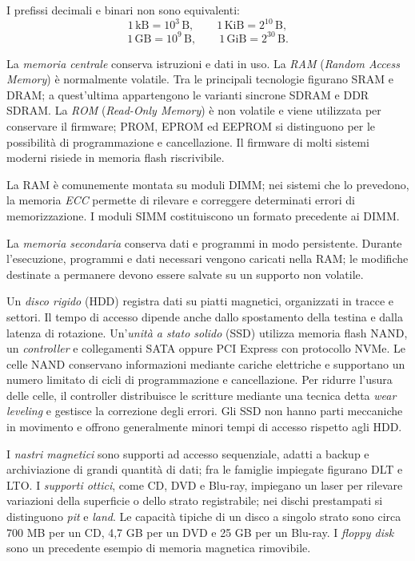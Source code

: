 I prefissi decimali e binari non sono equivalenti:
\[
  1\,\mathrm{kB}=10^3\,\mathrm{B},
  \qquad
  1\,\mathrm{KiB}=2^{10}\,\mathrm{B},
\]
\[
  1\,\mathrm{GB}=10^9\,\mathrm{B},
  \qquad
  1\,\mathrm{GiB}=2^{30}\,\mathrm{B}.
\]

La \emph{memoria centrale} conserva istruzioni e dati in uso.
La \emph{RAM} (\emph{Random Access Memory}) è normalmente volatile.
Tra le principali tecnologie figurano SRAM e DRAM; a quest'ultima
appartengono le varianti sincrone SDRAM e DDR SDRAM.
La \emph{ROM} (\emph{Read-Only Memory}) è non volatile e viene
utilizzata per conservare il firmware; PROM, EPROM ed EEPROM si
distinguono per le possibilità di programmazione e cancellazione. Il
firmware di molti sistemi moderni risiede in memoria flash riscrivibile.

La RAM è comunemente montata su moduli DIMM; nei sistemi che lo
prevedono, la memoria \emph{ECC} permette di rilevare e correggere
determinati errori di memorizzazione. I moduli SIMM costituiscono
un formato precedente ai DIMM.

La \emph{memoria secondaria} conserva dati e programmi in modo
persistente. Durante l'esecuzione, programmi e dati necessari vengono
caricati nella RAM; le modifiche destinate a permanere devono essere
salvate su un supporto non volatile.

Un \emph{disco rigido} (HDD) registra dati su piatti magnetici,
organizzati in tracce e settori. Il tempo di accesso dipende anche
dallo spostamento della testina e dalla latenza di rotazione.
Un'\emph{unità a stato solido} (SSD) utilizza memoria flash NAND,
un \emph{controller} e collegamenti SATA oppure PCI Express con
protocollo NVMe. Le celle NAND conservano informazioni mediante
cariche elettriche e supportano un numero limitato di cicli di
programmazione e cancellazione. Per ridurre l'usura delle celle,
il controller distribuisce le scritture mediante una tecnica detta
\emph{wear leveling} e gestisce la correzione degli errori.
Gli SSD non hanno parti meccaniche in movimento e offrono generalmente
minori tempi di accesso rispetto agli HDD.

I \emph{nastri magnetici} sono supporti ad accesso sequenziale,
adatti a backup e archiviazione di grandi quantità di dati; fra le
famiglie impiegate figurano DLT e LTO. I \emph{supporti ottici},
come CD, DVD e Blu-ray, impiegano un laser per rilevare variazioni
della superficie o dello strato registrabile; nei dischi prestampati
si distinguono \emph{pit} e \emph{land}. Le capacità tipiche di un
disco a singolo strato sono circa 700 MB per un CD, 4,7 GB per un
DVD e 25 GB per un Blu-ray. I \emph{floppy disk} sono un precedente
esempio di memoria magnetica rimovibile.

